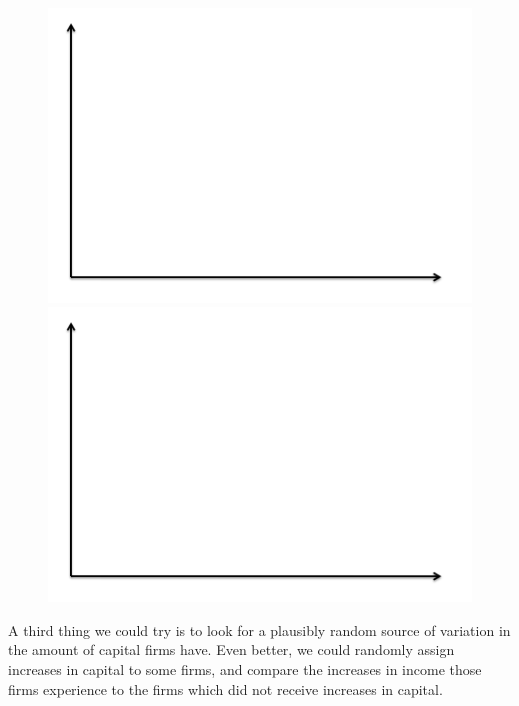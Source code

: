 \documentclass[12pt,english]{article}
\begin{document}
\begin{figure}[H]
	\begin{minipage}{.5\textwidth}
		\centering
		\includegraphics[width = \textwidth]{axes.png}
	\end{minipage}
	\begin{minipage}{.5\textwidth}
		\centering
		\includegraphics[width = \textwidth]{axes.png}
	\end{minipage}
\end{figure}

A third thing we could try is to look for a plausibly random source of variation in the amount of capital firms have. Even better, we could randomly assign increases in capital to some firms, and compare the increases in income those firms experience to the firms which did not receive increases in capital.
\end{document}
